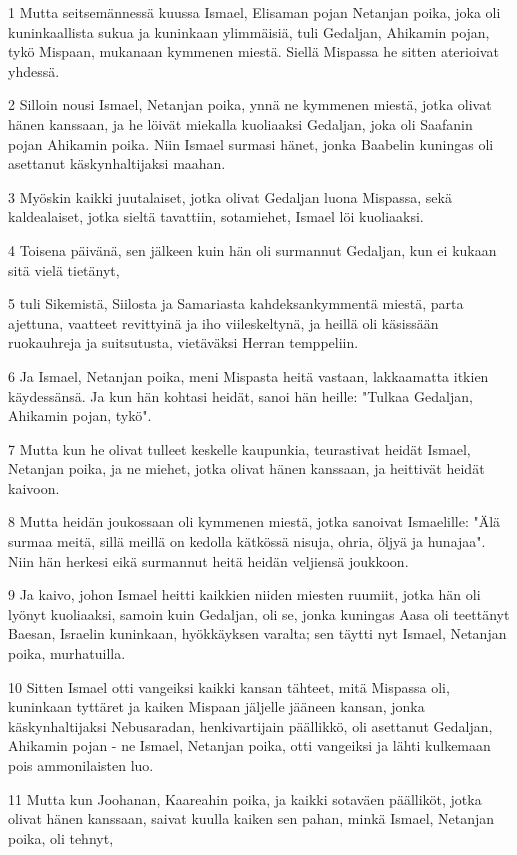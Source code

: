 \par 1 Mutta seitsemännessä kuussa Ismael, Elisaman pojan Netanjan poika, joka oli kuninkaallista sukua ja kuninkaan ylimmäisiä, tuli Gedaljan, Ahikamin pojan, tykö Mispaan, mukanaan kymmenen miestä. Siellä Mispassa he sitten aterioivat yhdessä.
\par 2 Silloin nousi Ismael, Netanjan poika, ynnä ne kymmenen miestä, jotka olivat hänen kanssaan, ja he löivät miekalla kuoliaaksi Gedaljan, joka oli Saafanin pojan Ahikamin poika. Niin Ismael surmasi hänet, jonka Baabelin kuningas oli asettanut käskynhaltijaksi maahan.
\par 3 Myöskin kaikki juutalaiset, jotka olivat Gedaljan luona Mispassa, sekä kaldealaiset, jotka sieltä tavattiin, sotamiehet, Ismael löi kuoliaaksi.
\par 4 Toisena päivänä, sen jälkeen kuin hän oli surmannut Gedaljan, kun ei kukaan sitä vielä tietänyt,
\par 5 tuli Sikemistä, Siilosta ja Samariasta kahdeksankymmentä miestä, parta ajettuna, vaatteet revittyinä ja iho viileskeltynä, ja heillä oli käsissään ruokauhreja ja suitsutusta, vietäväksi Herran temppeliin.
\par 6 Ja Ismael, Netanjan poika, meni Mispasta heitä vastaan, lakkaamatta itkien käydessänsä. Ja kun hän kohtasi heidät, sanoi hän heille: "Tulkaa Gedaljan, Ahikamin pojan, tykö".
\par 7 Mutta kun he olivat tulleet keskelle kaupunkia, teurastivat heidät Ismael, Netanjan poika, ja ne miehet, jotka olivat hänen kanssaan, ja heittivät heidät kaivoon.
\par 8 Mutta heidän joukossaan oli kymmenen miestä, jotka sanoivat Ismaelille: "Älä surmaa meitä, sillä meillä on kedolla kätkössä nisuja, ohria, öljyä ja hunajaa". Niin hän herkesi eikä surmannut heitä heidän veljiensä joukkoon.
\par 9 Ja kaivo, johon Ismael heitti kaikkien niiden miesten ruumiit, jotka hän oli lyönyt kuoliaaksi, samoin kuin Gedaljan, oli se, jonka kuningas Aasa oli teettänyt Baesan, Israelin kuninkaan, hyökkäyksen varalta; sen täytti nyt Ismael, Netanjan poika, murhatuilla.
\par 10 Sitten Ismael otti vangeiksi kaikki kansan tähteet, mitä Mispassa oli, kuninkaan tyttäret ja kaiken Mispaan jäljelle jääneen kansan, jonka käskynhaltijaksi Nebusaradan, henkivartijain päällikkö, oli asettanut Gedaljan, Ahikamin pojan - ne Ismael, Netanjan poika, otti vangeiksi ja lähti kulkemaan pois ammonilaisten luo.
\par 11 Mutta kun Joohanan, Kaareahin poika, ja kaikki sotaväen päälliköt, jotka olivat hänen kanssaan, saivat kuulla kaiken sen pahan, minkä Ismael, Netanjan poika, oli tehnyt,
